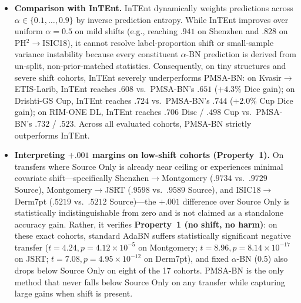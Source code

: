 \documentclass[11pt,a4paper]{article}
\begin{document}
\begin{itemize}
\begin{itemize}
  \item \emph{Dermoscopy:} On ISIC18$\to$PH$^2$ ($n=200$), PMSA-BN ($.918$) significantly beats the best baseline Source Only ($.913$, $t = 3.88, p = 1.44\times 10^{-4}$; Wilcoxon $p = 3.67\times 10^{-21}$) as well as AdaBN ($.866$, $t = 9.63, p = 2.95\times 10^{-18}$). On PH$^2\to$ISIC18 ($n=600$), PMSA-BN ($.8344$) significantly beats the best baseline Source Only ($.8312$, $\Delta = +0.0031$, $95\%$ bootstrap CI $[+0.0014, +0.0051]$, Wilcoxon $p = 4.08\times 10^{-4}$), $\alpha$-BN (0.5) ($.8263$, $\Delta = +0.0081$, $95\%$ CI $[+0.0007, +0.0155]$), and AdaBN ($.6804$, $\Delta = +0.1540$, Wilcoxon $p = 2.38\times 10^{-30}$). On ISIC18$\to$HAM10000 ($n=500$) and ISIC18$\to$Derm7pt ($n=500$), PMSA-BN reverses AdaBN's negative transfer ($t = 16.90, p = 5.43\times 10^{-51}$ and $t = 7.08, p = 4.95\times 10^{-12}$ vs.\ AdaBN).
  \end{itemize}
\item \textbf{Comparison with InTEnt.} InTEnt dynamically weights predictions across $\alpha \in \{0.1, \dots, 0.9\}$ by inverse prediction entropy. While InTEnt improves over uniform $\alpha=0.5$ on mild shifts (e.g., reaching $.941$ on Shenzhen and $.828$ on PH$^2\to$ISIC18), it cannot resolve label-proportion shift or small-sample variance instability because every constituent $\alpha$-BN prediction is derived from un-split, non-prior-matched statistics. Consequently, on tiny structures and severe shift cohorts, InTEnt severely underperforms PMSA-BN: on Kvasir$\to$ETIS-Larib, InTEnt reaches $.608$ vs.\ PMSA-BN's $.651$ ($+4.3\%$ Dice gain); on Drishti-GS Cup, InTEnt reaches $.724$ vs.\ PMSA-BN's $.744$ ($+2.0\%$ Cup Dice gain); on RIM-ONE DL, InTEnt reaches $.706$ Disc / $.498$ Cup vs.\ PMSA-BN's $.732$ / $.523$. Across all evaluated cohorts, PMSA-BN strictly outperforms InTEnt.
\item \textbf{Interpreting $+.001$ margins on low-shift cohorts (Property~1).} On transfers where Source Only is already near ceiling or experiences minimal covariate shift---specifically Shenzhen$\to$Montgomery ($.9734$ vs.\ $.9729$ Source), Montgomery$\to$JSRT ($.9598$ vs.\ $.9589$ Source), and ISIC18$\to$Derm7pt ($.5219$ vs.\ $.5212$ Source)---the $+.001$ difference over Source Only is statistically indistinguishable from zero and is not claimed as a standalone accuracy gain. Rather, it verifies \textbf{Property~1 (no shift, no harm)}: on these exact cohorts, standard AdaBN suffers statistically significant negative transfer ($t = 4.24, p = 4.12\times 10^{-5}$ on Montgomery; $t = 8.96, p = 8.14\times 10^{-17}$ on JSRT; $t = 7.08, p = 4.95\times 10^{-12}$ on Derm7pt), and fixed $\alpha$-BN (0.5) also drops below Source Only on eight of the 17 cohorts. PMSA-BN is the only method that never falls below Source Only on any transfer while capturing large gains when shift is present.

\end{itemize}
\end{document}
